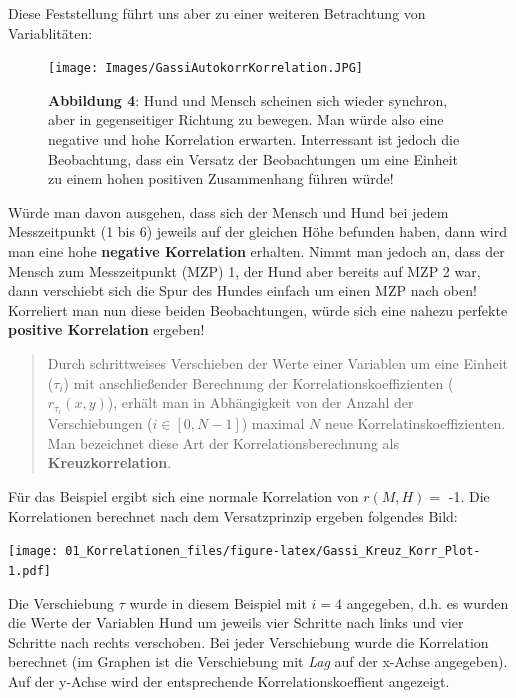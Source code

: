 \documentclass[]{article}
\begin{document}
Diese Feststellung führt uns aber zu einer weiteren Betrachtung von Variablitäten:

\begin{figure}
\centering
\texttt{[image: Images/GassiAutokorrKorrelation.JPG]}
\caption{\textbf{Abbildung 4}: Hund und Mensch scheinen sich wieder synchron, aber in gegenseitiger Richtung zu bewegen. Man würde also eine negative und hohe Korrelation erwarten. Interressant ist jedoch die Beobachtung, dass ein Versatz der Beobachtungen um eine Einheit zu einem hohen positiven Zusammenhang führen würde!}
\end{figure}

Würde man davon ausgehen, dass sich der Mensch und Hund bei jedem Messzeitpunkt (1 bis 6) jeweils auf der gleichen Höhe befunden haben, dann wird man eine hohe \textbf{negative Korrelation} erhalten. Nimmt man jedoch an, dass der Mensch zum Messzeitpunkt (MZP) 1, der Hund aber bereits auf MZP 2 war, dann verschiebt sich die Spur des Hundes einfach um einen MZP nach oben! Korreliert man nun diese beiden Beobachtungen, würde sich eine nahezu perfekte \textbf{positive Korrelation} ergeben!

\begin{quote}
Durch schrittweises Verschieben der Werte einer Variablen um eine Einheit (\(\tau_i\)) mit anschließender Berechnung der Korrelationskoeffizienten (\(r_{\tau_i}(x,y)\)), erhält man in Abhängigkeit von der Anzahl der Verschiebungen (\(i \in [0, N-1]\)) maximal \(N\) neue Korrelatinskoeffizienten. Man bezeichnet diese Art der Korrelationsberechnung als \textbf{Kreuzkorrelation}.
\end{quote}

Für das Beispiel ergibt sich eine normale Korrelation von \(r(M,H)=\) -1. Die Korrelationen berechnet nach dem Versatzprinzip ergeben folgendes Bild:

\texttt{[image: 01\_Korrelationen\_files/figure-latex/Gassi\_Kreuz\_Korr\_Plot-1.pdf]}

Die Verschiebung \(\tau\) wurde in diesem Beispiel mit \(i = 4\) angegeben, d.h. es wurden die Werte der Variablen Hund um jeweils vier Schritte nach links und vier Schritte nach rechts verschoben. Bei jeder Verschiebung wurde die Korrelation berechnet (im Graphen ist die Verschiebung mit \emph{Lag} auf der x-Achse angegeben). Auf der y-Achse wird der entsprechende Korrelationskoeffient angezeigt.
\end{document}
